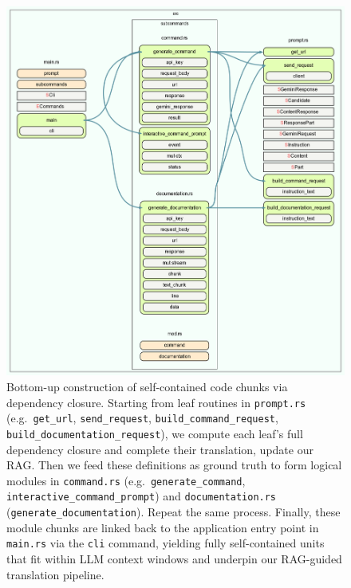 \documentclass[twocolumn]{article}
\begin{document}
\begin{figure}[!t]
        \centering
        \includegraphics[width=\textwidth]{figures/cfg.png}
        \caption{Bottom-up construction of self-contained code chunks via dependency closure. Starting from leaf routines in \texttt{prompt.rs} (e.g.\ \texttt{get\_url}, \texttt{send\_request}, \texttt{build\_command\_request}, \texttt{build\_documentation\_request}), we compute each leaf’s full dependency closure and complete their translation, update our RAG. Then we feed these definitions as ground truth to form logical modules in \texttt{command.rs} (e.g.\ \texttt{generate\_command}, \texttt{interactive\_command\_prompt}) and \texttt{documentation.rs} (\texttt{generate\_documentation}). Repeat the same process. Finally, these module chunks are linked back to the application entry point in \texttt{main.rs} via the \texttt{cli} command, yielding fully self-contained units that fit within LLM context windows and underpin our RAG-guided translation pipeline.} 
        \label{fig:translate-overview1}
\end{figure}
\end{document}
